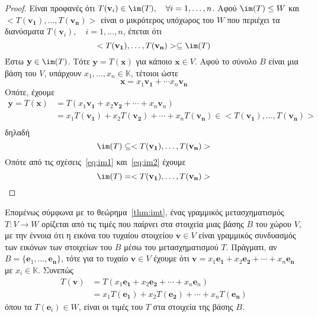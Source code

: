 \begin{proof}
  Είναι προφανές ότι $ T(\mathbf{v}_{i}) \in \im(T), \quad \forall i = 1,\ldots, n $. 
  Αφού $ \im(T) \leq W $ και $ < T(\mathbf{v_{1}}), \ldots, T(\mathbf{v_{n}}) > $ είναι 
  ο μικρότερος υπόχωρος του $W$ που περιέχει τα διανύσματα $ T(\mathbf{v}_{i}), \quad i =
  1,\ldots, n$, έπεται ότι 
  \begin{equation}\label{eq:im1}
    < T(\mathbf{v_{1}}), \ldots, T(\mathbf{v_{n}}) > \subseteq \im(T)  
  \end{equation} 
  Έστω $ \mathbf{y} \in \im(T) $. Τότε $ \mathbf{y}= T(\mathbf{x}) $ για κάποιο $
  \mathbf{x} \in V $. Αφού το σύνολο $B$ είναι μια βάση του $V$, υπάρχουν $ x_{1}, 
  \ldots, x_{n} \in \mathbb{K} $, τέτοιοι ώστε
  \[
    \mathbf{x} = x_{1} \mathbf{v_{1}} + \cdots x_{n} \mathbf{v_{n}}
  \] 
  Οπότε, έχουμε
  \begin{align*}
    \mathbf{y} = T(\mathbf{x})  
    &= T(x_{1} \mathbf{v_{1}}+ x_{2} \mathbf{v_{2}}+ 
    \cdots + x_{n} \mathbf{v}_{n}) \\ 
    &= x_{1}T(\mathbf{v_{1}}) + x_{2}T(\mathbf{v_{2}}) + \cdots + x_{n} 
    T(\mathbf{v_{n}}) \in  < T(\mathbf{v_{1}}), \ldots, T(\mathbf{v_{n}}) >\\ 
  \end{align*}
  δηλαδή
  \begin{equation}\label{eq:im2} 
    \im(T) \subseteq < T(\mathbf{v_{1}}), \ldots, T(\mathbf{v_{n}}) > 
  \end{equation} 
  Οπότε από τις σχέσεις~\eqref{eq:im1} και~\eqref{eq:im2} έχουμε
  \[
    \im(T) = < T(\mathbf{v_{1}}), \ldots, T(\mathbf{v_{n}}) >  
  \]
\end{proof}

\begin{rem}
  Επομένως σύμφωνα με το θεώρημα~\ref{thm:imt}, ένας γραμμικός μετασχηματισμός 
  $ T \colon V \to W $ ορίζεται από τις τιμές που παίρνει στα στοιχεία μιας βάσης 
  $ B $ του χώρου $V$, με την έννοια ότι η εικόνα του τυχαίου στοιχείου 
  $ \mathbf{v} \in V $ είναι γραμμικός συνδυασμός των εικόνων των στοιχείων του 
  $B$ μέσω του μετασχηματισμού $T$. 
  Πράγματι, αν
  $ B = \{ \mathbf{e}_{1}, \ldots, \mathbf{e_{n}} \} $, 
  τότε για το τυχαίο $ \mathbf{v} \in V $ έχουμε ότι 
  $ \mathbf{v}= x_{1} \mathbf{e_{1}} + x_{2} \mathbf{e_{2}} +  
  \cdots + x_{n} \mathbf{e_{n}} $ με $ x_{i} \in \mathbb{K} $. Συνεπώς
  \begin{align*}
    T(\mathbf{v}) & = T(x_{1} \mathbf{e_{1}}+ x_{2} \mathbf{e_{2}}+ \cdots + x_{n}
    \mathbf{e}_{n}) \\ 
                  &= x_{1}T(\mathbf{e_{1}}) + x_{2}T(\mathbf{e_{2}}) + \cdots + x_{n} 
                  T(\mathbf{e_{n}})
  \end{align*}
  όπου τα $ T(\mathbf{e}_{i}) \in W $, είναι οι τιμές του $T$ στα 
  στοιχεία της βάσης $B$.
\end{rem}

